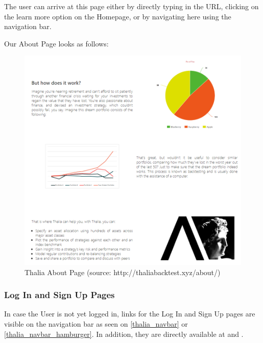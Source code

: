 \documentclass[main.tex]{subfiles}
\begin{document}
The user can arrive at this page either by directly typing in the URL, clicking on the learn more option on the Homepage, or by navigating here using the navigation bar.



Our About Page looks as follows:



\begin{figure}[H]

   \centering

   \includegraphics[width=\textwidth]{08Appendices/081User/081Pictures/about.png}

   \caption{Thalia About Page (source: http://thaliabacktest.xyz/about/)}

   \label{thalia_about}

\end{figure}



\subsubsection{Log In and Sign Up Pages}

In case the User is not yet logged in, links for the Log In and Sign Up pages are visible on the navigation bar as seen on \figurename{\ref{thalia_navbar}} or \figurename{\ref{thalia_navbar_hamburger}}. In addition, they are directly available at  and .
\end{document}
